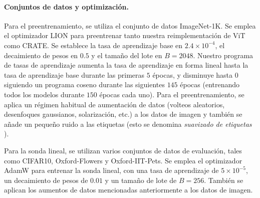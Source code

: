 \documentclass[../../book-main_es.tex]{subfiles}
\begin{document}
\paragraph{Conjuntos de datos y optimización.} Para el preentrenamiento, se utiliza el
conjunto de datos ImageNet-1K. Se emplea el optimizador LION
\citep{chen2024symbolic} para preentrenar tanto nuestra reimplementación de ViT como
CRATE. Se establece la tasa de aprendizaje base en \(2.4 \times
10^{-4}\), el decaimiento de pesos en \(0.5\) y el tamaño del lote en \(B =
2048\). Nuestro programa de tasas de aprendizaje aumenta la tasa de aprendizaje
en forma lineal hasta la tasa de aprendizaje base durante las primeras \(5\) épocas, y
disminuye hasta \(0\) siguiendo un programa coseno durante las siguientes \(145\)
épocas (entrenando todos los modelos durante \(150\) épocas cada uno). Para el
preentrenamiento, se aplica un régimen habitual de aumentación de datos (volteos aleatorios,
desenfoques gaussianos, solarización, etc.) a los datos de imagen y también se añade
un pequeño ruido a las etiquetas (esto se denomina \textit{suavizado de etiquetas}
\citep{muller2019does}).

Para la sonda lineal, se utilizan varios conjuntos de datos de evaluación, tales como
CIFAR10, Oxford-Flowers y Oxford-IIT-Pets. Se emplea el optimizador AdamW
para entrenar la sonda lineal, con una tasa de aprendizaje de \(5 \times
10^{-5}\), un decaimiento de pesos de \(0.01\) y un tamaño de lote de \(B = 256\). También
se aplican los aumentos de datos mencionadas anteriormente a los datos de imagen.
\end{document}
